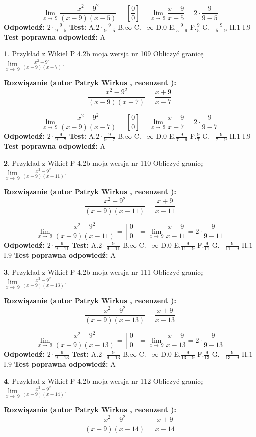 \documentclass[12pt, a4paper]{article}
\theoremstyle{definition} %
\newtheorem{zad}{}
\newcommand{\zadStart}[1]{\begin{zad}#1\newline}
\newcommand{\zadStop}{\end{zad}}
\newcommand{\rozwStart}[2]{\noindent \textbf{Rozwiązanie (autor #1 , recenzent #2): }\newline}
\newcommand{\rozwStop}{\newline}
\newcommand{\odpStart}{\noindent \textbf{Odpowiedź:}\newline}
\newcommand{\odpStop}{\newline}
\newcommand{\testStart}{\noindent \textbf{Test:}\newline}
\newcommand{\testStop}{\newline}
\newcommand{\kluczStart}{\noindent \textbf{Test poprawna odpowiedź:}\newline}
\newcommand{\kluczStop}{\newline}
\begin{document}
$$\lim\limits_{x\to\ 9}\frac{x^{2}-9^{2}}{(x-9)(x-5)}=[\frac{0}{0}]=\lim\limits_{x\to\ 9}\frac{x+9}{x-5}=2 \cdot \frac{9}{9-5}$$
\rozwStop
\odpStart
$2 \cdot \frac{9}{9-5}$
\odpStop
\testStart
A.$2 \cdot \frac{9}{9-5}$
B.$\infty$
C.$-\infty$
D.$0$
E.$\frac{9}{5-9}$
F.$\frac{9}{5}$
G.$-\frac{9}{5-9}$
H.$1$
I.$9$
\testStop
\kluczStart
A
\kluczStop



\zadStart{Przykład z Wikieł P 4.2b moja wersja nr 109}
Obliczyć granicę $\lim\limits_{x\to\ 9}\frac{x^{2}-9^{2}}{(x-9)(x-7)}$.
\zadStop
\rozwStart{Patryk Wirkus}{}
$$\frac{x^{2}-9^{2}}{(x-9)(x-7)}=\frac{x+9}{x-7}$$

$$\lim\limits_{x\to\ 9}\frac{x^{2}-9^{2}}{(x-9)(x-7)}=[\frac{0}{0}]=\lim\limits_{x\to\ 9}\frac{x+9}{x-7}=2 \cdot \frac{9}{9-7}$$
\rozwStop
\odpStart
$2 \cdot \frac{9}{9-7}$
\odpStop
\testStart
A.$2 \cdot \frac{9}{9-7}$
B.$\infty$
C.$-\infty$
D.$0$
E.$\frac{9}{7-9}$
F.$\frac{9}{7}$
G.$-\frac{9}{7-9}$
H.$1$
I.$9$
\testStop
\kluczStart
A
\kluczStop



\zadStart{Przykład z Wikieł P 4.2b moja wersja nr 110}
Obliczyć granicę $\lim\limits_{x\to\ 9}\frac{x^{2}-9^{2}}{(x-9)(x-11)}$.
\zadStop
\rozwStart{Patryk Wirkus}{}
$$\frac{x^{2}-9^{2}}{(x-9)(x-11)}=\frac{x+9}{x-11}$$

$$\lim\limits_{x\to\ 9}\frac{x^{2}-9^{2}}{(x-9)(x-11)}=[\frac{0}{0}]=\lim\limits_{x\to\ 9}\frac{x+9}{x-11}=2 \cdot \frac{9}{9-11}$$
\rozwStop
\odpStart
$2 \cdot \frac{9}{9-11}$
\odpStop
\testStart
A.$2 \cdot \frac{9}{9-11}$
B.$\infty$
C.$-\infty$
D.$0$
E.$\frac{9}{11-9}$
F.$\frac{9}{11}$
G.$-\frac{9}{11-9}$
H.$1$
I.$9$
\testStop
\kluczStart
A
\kluczStop



\zadStart{Przykład z Wikieł P 4.2b moja wersja nr 111}
Obliczyć granicę $\lim\limits_{x\to\ 9}\frac{x^{2}-9^{2}}{(x-9)(x-13)}$.
\zadStop
\rozwStart{Patryk Wirkus}{}
$$\frac{x^{2}-9^{2}}{(x-9)(x-13)}=\frac{x+9}{x-13}$$

$$\lim\limits_{x\to\ 9}\frac{x^{2}-9^{2}}{(x-9)(x-13)}=[\frac{0}{0}]=\lim\limits_{x\to\ 9}\frac{x+9}{x-13}=2 \cdot \frac{9}{9-13}$$
\rozwStop
\odpStart
$2 \cdot \frac{9}{9-13}$
\odpStop
\testStart
A.$2 \cdot \frac{9}{9-13}$
B.$\infty$
C.$-\infty$
D.$0$
E.$\frac{9}{13-9}$
F.$\frac{9}{13}$
G.$-\frac{9}{13-9}$
H.$1$
I.$9$
\testStop
\kluczStart
A
\kluczStop



\zadStart{Przykład z Wikieł P 4.2b moja wersja nr 112}
Obliczyć granicę $\lim\limits_{x\to\ 9}\frac{x^{2}-9^{2}}{(x-9)(x-14)}$.
\zadStop
\rozwStart{Patryk Wirkus}{}
$$\frac{x^{2}-9^{2}}{(x-9)(x-14)}=\frac{x+9}{x-14}$$
\end{document}
